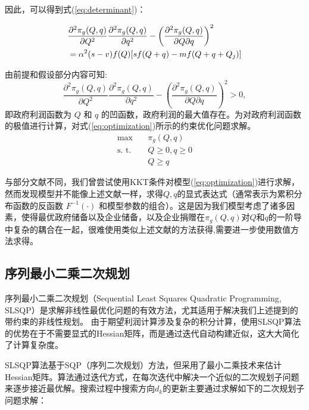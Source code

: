 \documentclass[a4paper,8pt,twocolumn]{article} %
\begin{document}
因此，可以得到式(\ref{eq:determinant})：
\begin{small}
\begin{align}\label{eq:determinant}
    & \frac{\partial^2 \pi_g(Q,q)}{\partial Q^2} \frac{\partial^2 \pi_g(Q,q)}{\partial q^2} - \left(\frac{\partial^2 \pi_g(Q,q)}{\partial Q\partial q}\right)^2 \notag \\
    & = \alpha^2 (s-v)f(Q)[sf(Q+q)-mf(Q+q+Q_j)]
\end{align}
\end{small}


由前提和假设部分内容可知:
\begin{equation*}
\frac{\partial^2 \pi_g(Q,q)}{\partial Q^2} \frac{\partial^2 \pi_g(Q,q)}{\partial q^2} - \left(\frac{\partial^2 \pi_g(Q,q)}{\partial Q\partial q}\right)^2 > 0,
\end{equation*}
即政府利润函数为 $Q$ 和 $q$ 的凹函数，政府利润的最大值存在。为对政府利润函数的极值进行计算，对式(\ref{eq:optimization})所示的约束优化问题求解。
\begin{equation} \label{eq:optimization}
\begin{split}
\max \quad & \pi_g(Q,q) \\
\text{s. t.} \quad & Q \ge 0 ,q \ge 0\\
& Q\ge q
\end{split}
\end{equation}

与部分文献\cite{Li2022Stackelberg,li2022政企联合储备,Li2024CooperationStrategies}不同，我们曾尝试使用KKT条件对模型(\ref{eq:optimization})进行求解，然而发现模型并不能像上述文献一样，求得$Q,q$的显式表达式（通常表示为累积分布函数的反函数 $F^{-1}(\cdot)$ 和模型参数的组合）。这是因为我们模型考虑了诸多因素，使得最优政府储备以及企业储备，以及企业捐赠在$\pi_g(Q,q)$对$Q$和$q$的一阶导中复杂的耦合在一起，很难使用类似上述文献的方法获得,需要进一步使用数值方法求得。
\subsection{序列最小二乘二次规划}
序列最小二乘二次规划（Sequential Least Squares Quadratic Programming, SLSQP）是求解非线性最优化问题的有效方法，尤其适用于解决我们上述提到的带约束的非线性规划。
由于期望利润计算涉及复杂的积分计算，使用SLSQP算法的优势在于不需要显式的Hessian矩阵，而是通过迭代自动构建近似，这大大简化了计算复杂度。


SLSQP算法基于SQP（序列二次规划）方法，但采用了最小二乘技术来估计Hessian矩阵。算法通过迭代方式，在每次迭代中解决一个近似的二次规划子问题来逐步接近最优解。搜索过程中搜索方向$d_k$的更新主要通过求解如下的二次规划子问题求解：
\end{document}

